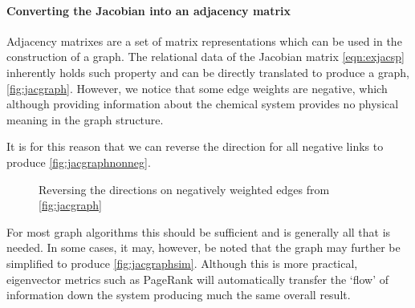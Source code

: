 \paragraph{Converting the Jacobian into an adjacency matrix}
Adjacency matrixes are a set of matrix representations which can be used in the construction of a graph. The relational data of the Jacobian matrix \autoref{eqn:exjacsp} inherently holds such property and can be directly translated to produce a graph, \autoref{fig:jacgraph}. However, we notice that some edge weights are negative, which although providing information about the chemical system provides no physical meaning in the graph structure.

It is for this reason that we can reverse the direction for all negative links to produce \autoref{fig:jacgraphnonneg}.

\begin{figure}[H]
\begin{center}

\end{center}

\caption{ Reversing the directions on negatively weighted edges from \autoref{fig:jacgraph}}\label{fig:jacgraphnonneg}
\end{figure}


For most graph algorithms this should be sufficient and is generally all that is needed. In some cases, it may, however, be noted that the graph may further be simplified to produce \autoref{fig:jacgraphsim}. Although this is more practical, eigenvector metrics such as PageRank will automatically transfer the `flow' of information down the system producing much the same overall result.

